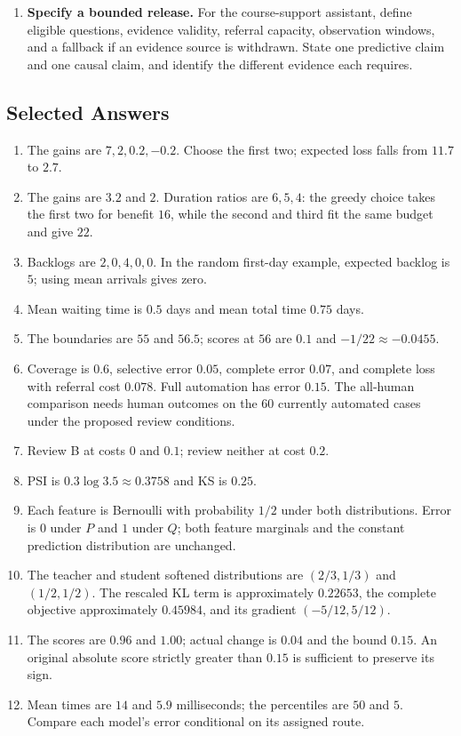 \begin{enumerate}
\item \textbf{Specify a bounded release.} For the course-support assistant, define eligible questions, evidence validity, referral capacity, observation windows, and a fallback if an evidence source is withdrawn. State one predictive claim and one causal claim, and identify the different evidence each requires.\par

\end{enumerate}

\subsection*{Selected Answers}

\begin{enumerate}
\item The gains are $7,2,0.2,-0.2$. Choose the first two; expected loss falls from $11.7$ to $2.7$.
\item The gains are $3.2$ and $2$. Duration ratios are $6,5,4$: the greedy choice takes the first two for benefit $16$, while the second and third fit the same budget and give $22$.
\item Backlogs are $2,0,4,0,0$. In the random first-day example, expected backlog is $5$; using mean arrivals gives zero.
\item Mean waiting time is $0.5$ days and mean total time $0.75$ days.
\item The boundaries are $55$ and $56.5$; scores at $56$ are $0.1$ and $-1/22\approx-0.0455$.
\item Coverage is $0.6$, selective error $0.05$, complete error $0.07$, and complete loss with referral cost $0.078$. Full automation has error $0.15$. The all-human comparison needs human outcomes on the $60$ currently automated cases under the proposed review conditions.
\item Review B at costs $0$ and $0.1$; review neither at cost $0.2$.
\item PSI is $0.3\log3.5\approx0.3758$ and KS is $0.25$.
\item Each feature is Bernoulli with probability $1/2$ under both distributions. Error is $0$ under $P$ and $1$ under $Q$; both feature marginals and the constant prediction distribution are unchanged.
\item The teacher and student softened distributions are $(2/3,1/3)$ and $(1/2,1/2)$. The rescaled KL term is approximately $0.22653$, the complete objective approximately $0.45984$, and its gradient $(-5/12,5/12)$.
\item The scores are $0.96$ and $1.00$; actual change is $0.04$ and the bound $0.15$. An original absolute score strictly greater than $0.15$ is sufficient to preserve its sign.
\item Mean times are $14$ and $5.9$ milliseconds; the percentiles are $50$ and $5$. Compare each model's error conditional on its assigned route.
\end{enumerate}

